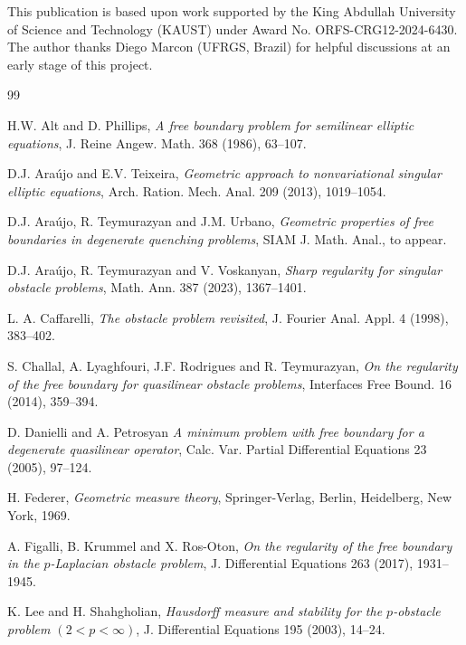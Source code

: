 \documentclass[11pt, reqno]{amsart}
\numberwithin{equation}{section}
\numberwithin{theorem}{section}
\numberwithin{lemma}{section}
\numberwithin{corollary}{section}
\numberwithin{remark}{section}
\numberwithin{proposition}{section}
\numberwithin{definition}{section}
\begin{document}
\bigskip

{\small {}} {\footnotesize This publication is based upon work supported by the King Abdullah University of Science and Technology (KAUST) under Award No. ORFS-CRG12-2024-6430. The author thanks Diego Marcon (UFRGS, Brazil) for helpful discussions at an early stage of this project.}

\begin{thebibliography}{99}

     H.W. Alt and D. Phillips,
    \textit{A free boundary problem for semilinear elliptic equations},
    J. Reine Angew. Math. 368 (1986), 63--107.
    
     D.J. Ara\'ujo and E.V. Teixeira,
    \textit{Geometric approach to nonvariational singular elliptic equations}, 
    Arch. Ration. Mech. Anal. 209 (2013), 1019--1054.

     D.J. Ara\'ujo, R. Teymurazyan and J.M. Urbano, 
    \textit{Geometric properties of free boundaries in degenerate quenching problems},
    SIAM J. Math. Anal., to appear.

     D.J. Ara\'ujo, R. Teymurazyan and V. Voskanyan, \textit{Sharp regularity for singular obstacle problems}, Math. Ann. 387 (2023), 1367--1401.

     L. A. Caffarelli, 
    \textit{The obstacle problem revisited}, 
    J. Fourier Anal. Appl. 4 (1998), 383--402.

     S. Challal, A. Lyaghfouri, J.F. Rodrigues and R. Teymurazyan,
    \textit{On the regularity of the free boundary for quasilinear obstacle problems},
    Interfaces Free Bound. 16 (2014), 359--394.

     D. Danielli and A. Petrosyan
    \textit{A minimum problem with free boundary for a degenerate quasilinear operator},
    Calc. Var. Partial Differential Equations 23 (2005), 97--124.    

     H. Federer,
    \textit{Geometric measure theory},
    Springer-Verlag, Berlin, Heidelberg, New York, 1969.

     A. Figalli, B. Krummel and X. Ros-Oton,
    \textit{On the regularity of the free boundary in the $p$-Laplacian obstacle problem}, 
    J. Differential Equations 263 (2017), 1931--1945.

     K. Lee and H. Shahgholian,
    \textit{Hausdorff measure and stability for the $p$-obstacle problem $(2<p<\infty)$},
    J. Differential Equations 195 (2003), 14--24.


\end{thebibliography}
\end{document}
